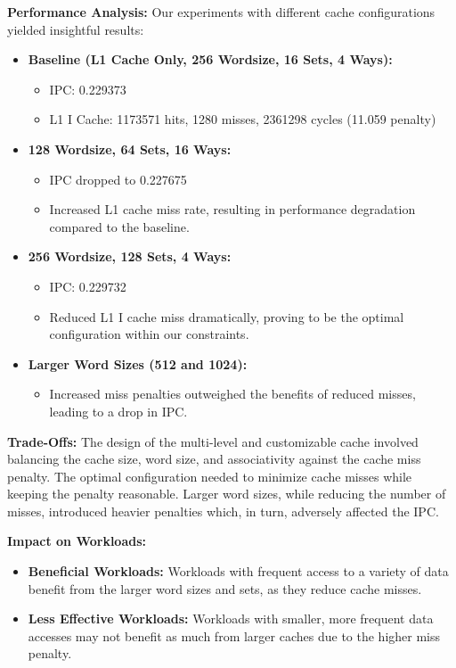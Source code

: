 \documentclass[12pt, a4paper]{article}
\begin{document}
    \textbf{Performance Analysis:}
    Our experiments with different cache configurations yielded insightful results:
    
    \begin{itemize}
        \item \textbf{Baseline (L1 Cache Only, 256 Wordsize, 16 Sets, 4 Ways):} 
        \begin{itemize}
            \item IPC: 0.229373
            \item L1 I Cache: 1173571 hits, 1280 misses, 2361298 cycles (11.059 penalty)
        \end{itemize}
        \item \textbf{128 Wordsize, 64 Sets, 16 Ways:} 
        \begin{itemize}
            \item IPC dropped to 0.227675
            \item Increased L1 cache miss rate, resulting in performance degradation compared to the baseline.
        \end{itemize}
        \item \textbf{256 Wordsize, 128 Sets, 4 Ways:} 
        \begin{itemize}
            \item IPC: 0.229732
            \item Reduced L1 I cache miss dramatically, proving to be the optimal configuration within our constraints.
        \end{itemize}
        \item \textbf{Larger Word Sizes (512 and 1024):} 
        \begin{itemize}
            \item Increased miss penalties outweighed the benefits of reduced misses, leading to a drop in IPC.
        \end{itemize}
    \end{itemize}
    
    \textbf{Trade-Offs:}
    The design of the multi-level and customizable cache involved balancing the cache size, word size, and associativity against the cache miss penalty. The optimal configuration needed to minimize cache misses while keeping the penalty reasonable. Larger word sizes, while reducing the number of misses, introduced heavier penalties which, in turn, adversely affected the IPC.
    
    \textbf{Impact on Workloads:}
    \begin{itemize}
        \item \textbf{Beneficial Workloads:} Workloads with frequent access to a variety of data benefit from the larger word sizes and sets, as they reduce cache misses.
        \item \textbf{Less Effective Workloads:} Workloads with smaller, more frequent data accesses may not benefit as much from larger caches due to the higher miss penalty.
    \end{itemize}
    
\end{document}
